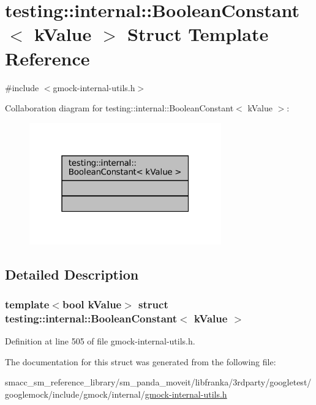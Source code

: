 \hypertarget{structtesting_1_1internal_1_1BooleanConstant}{}\section{testing\+:\+:internal\+:\+:Boolean\+Constant$<$ k\+Value $>$ Struct Template Reference}
\label{structtesting_1_1internal_1_1BooleanConstant}


{\ttfamily \#include $<$gmock-\/internal-\/utils.\+h$>$}



Collaboration diagram for testing\+:\+:internal\+:\+:Boolean\+Constant$<$ k\+Value $>$\+:
\nopagebreak
\begin{figure}[H]
\begin{center}
\leavevmode
\includegraphics[width=235pt]{structtesting_1_1internal_1_1BooleanConstant__coll__graph}
\end{center}
\end{figure}


\subsection{Detailed Description}
\subsubsection*{template$<$bool k\+Value$>$\newline
struct testing\+::internal\+::\+Boolean\+Constant$<$ k\+Value $>$}



Definition at line 505 of file gmock-\/internal-\/utils.\+h.



The documentation for this struct was generated from the following file\+:\begin{DoxyCompactItemize}
\item 
smacc\+\_\+sm\+\_\+reference\+\_\+library/sm\+\_\+panda\+\_\+moveit/libfranka/3rdparty/googletest/googlemock/include/gmock/internal/\hyperlink{gmock-internal-utils_8h}{gmock-\/internal-\/utils.\+h}\end{DoxyCompactItemize}
